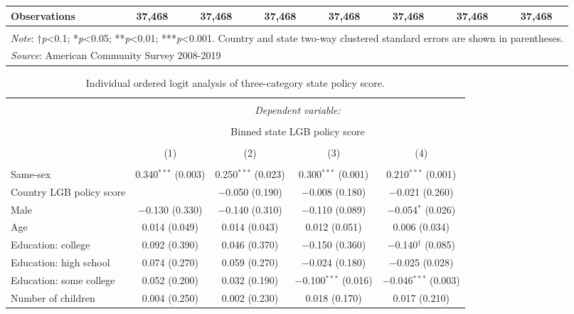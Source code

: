 \documentclass[
  11pt,
]{article}
\begin{document}
\begin{table}[H]
\begin{tabular}{@{\extracolsep{2pt}}lccccccc}
Observations & 37,468 & 37,468 & 37,468 & 37,468 & 37,468 & 37,468 & 37,468 \\ 
\hline 
\hline \\[-1.8ex] 
\multicolumn{8}{l}{\parbox[t]{\textwidth}{\textit{Note}: †\textit{p}<0.1; *\textit{p}<0.05; **\textit{p}<0.01; ***\textit{p}<0.001. Country and state two-way clustered standard errors are shown in parentheses.}} \\ 
\multicolumn{8}{l}{\textit{Source}: American Community Survey 2008-2019} \\ 
\end{tabular} 
\end{table}

\begin{table}[H] \centering 
  \caption{Individual ordered logit analysis of three-category state policy score.} 
  \label{tab:ord-full} 
\footnotesize 
\begin{tabular}{@{\extracolsep{5pt}}lcccc} 
\\[-1.8ex]\hline 
\hline \\[-1.8ex] 
 & \multicolumn{4}{c}{\textit{Dependent variable:}} \\ 
\cline{2-5} 
\\[-1.8ex] & \multicolumn{4}{c}{Binned state LGB policy score} \\ 
\\[-1.8ex] & (1) & (2) & (3) & (4)\\ 
\hline \\[-1.8ex] 
 Same-sex & 0.340$^{***}$ (0.003) & 0.250$^{***}$ (0.023) & 0.300$^{***}$ (0.001) & 0.210$^{***}$ (0.001) \\ 
  Country LGB policy score &  & $-$0.050 (0.190) & $-$0.008 (0.180) & $-$0.021 (0.260) \\ 
  Male & $-$0.130 (0.330) & $-$0.140 (0.310) & $-$0.110 (0.089) & $-$0.054$^{*}$ (0.026) \\ 
  Age & 0.014 (0.049) & 0.014 (0.043) & 0.012 (0.051) & 0.006 (0.034) \\ 
  Education: college & 0.092 (0.390) & 0.046 (0.370) & $-$0.150 (0.360) & $-$0.140$^{†}$ (0.085) \\ 
  Education: high school & 0.074 (0.270) & 0.059 (0.270) & $-$0.024 (0.180) & $-$0.025 (0.028) \\ 
  Education: some college & 0.052 (0.200) & 0.032 (0.190) & $-$0.100$^{***}$ (0.016) & $-$0.046$^{***}$ (0.003) \\ 
  Number of children & 0.004 (0.250) & 0.002 (0.230) & 0.018 (0.170) & 0.017 (0.210) \\ 

\end{tabular}
\end{table}
\end{document}
